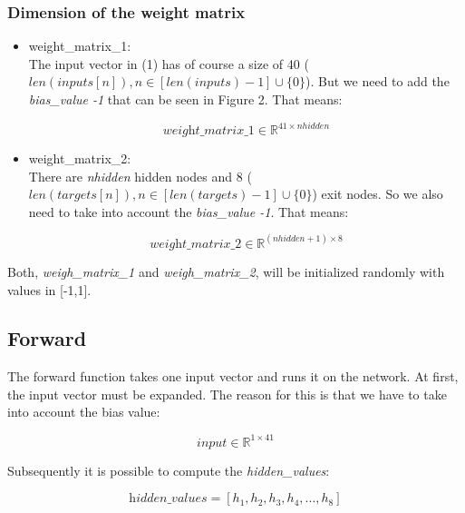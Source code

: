 \documentclass[10pt,a4paper]{article}
\begin{document}
	\subsubsection{Dimension of the weight matrix}			%
		\begin{itemize}
		\item weight\_matrix\_1: \\
		The input vector in (1) has of course a size of 40 ($len(inputs[n]), n \in [len(inputs) -1] \cup \{0\}$). But we need to add the \textit{bias\_value -1} that can be seen in Figure 2. That means: \\ 
		\begin{center}
			\begin{equation}
			 \textit{weight\_matrix\_1} \in \mathbb{R}^{41 \times nhidden} 
			\end{equation} 
		\end{center}
		\item weight\_matrix\_2: \\
		There are \textit{nhidden} hidden nodes and 8 ($len(targets[n]), n \in [len(targets) -1] \cup \{0\}$) exit nodes. So we also need to take into account the \textit{bias\_value -1}. That means: \\
		\begin{center}
			\begin{equation}
			\textit{weight\_matrix\_2} \in \mathbb{R}^{(nhidden+1) \times 8} 
			\end{equation}  
		\end{center}
	\end{itemize} 
	Both, \textit{weigh\_matrix\_1} and \textit{weigh\_matrix\_2}, will be initialized randomly with values in [-1,1].
	
	\subsection{Forward}								%
	The forward function takes one input vector and runs it on the network. At first, the input vector must be expanded. The reason for this is that we have to take into account the bias value:	
	\begin{center}
		\begin{equation}
		\textit{input} \in \mathbb{R}^{1\times 41} 
		\end{equation} 
	\end{center}
	Subsequently it is possible to compute the \textit{hidden\_values}:
	\begin{center}
		\begin{equation}
		\textit{hidden\_values} = [h_1,h_2,h_3,h_4,...,h_8]
		\end{equation} 
	\end{center}
\end{document}

